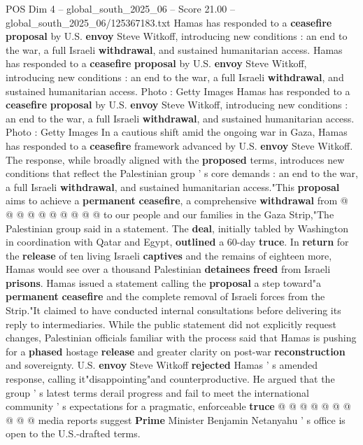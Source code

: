 \begin{textsample}{POS Dim 4 – global\_south\_2025\_06 – Score 21.00 – global\_south\_2025\_06/125367183.txt}  \label{ex:f4_pos_352}
Hamas has responded to a \textbf{ceasefire} \textbf{proposal} by U.S. \textbf{envoy} Steve Witkoff, introducing new conditions : an end to the war, a full Israeli \textbf{withdrawal}, and sustained humanitarian access.
Hamas has responded to a \textbf{ceasefire} \textbf{proposal} by U.S. \textbf{envoy} Steve Witkoff, introducing new conditions : an end to the war, a full Israeli \textbf{withdrawal}, and sustained humanitarian access.
Photo : Getty Images Hamas has responded to a \textbf{ceasefire} \textbf{proposal} by U.S. \textbf{envoy} Steve Witkoff, introducing new conditions : an end to the war, a full Israeli \textbf{withdrawal}, and sustained humanitarian access.
Photo : Getty Images In a cautious shift amid the ongoing war in Gaza, Hamas has responded to a \textbf{ceasefire} framework advanced by U.S. \textbf{envoy} Steve Witkoff.
The response, while broadly aligned with the \textbf{proposed} terms, introduces new conditions that reflect the Palestinian group ' s core demands : an end to the war, a full Israeli \textbf{withdrawal}, and sustained humanitarian access."This \textbf{proposal} aims to achieve a \textbf{permanent} \textbf{ceasefire}, a comprehensive \textbf{withdrawal} from @ @ @ @ @ @ @ @ @ @ to our people and our families in the Gaza Strip,"The Palestinian group said in a statement.
The \textbf{deal}, initially tabled by Washington in coordination with Qatar and Egypt, \textbf{outlined} a 60-day \textbf{truce}.
In \textbf{return} for the \textbf{release} of ten living Israeli \textbf{captives} and the remains of eighteen more, Hamas would see over a thousand Palestinian \textbf{detainees} \textbf{freed} from Israeli \textbf{prisons}.
Hamas issued a statement calling the \textbf{proposal} a step toward"a \textbf{permanent} \textbf{ceasefire} and the complete removal of Israeli forces from the Strip."It claimed to have conducted internal consultations before delivering its reply to intermediaries.
While the public statement did not explicitly request changes, Palestinian officials familiar with the process said that Hamas is pushing for a \textbf{phased} hostage \textbf{release} and greater clarity on post-war \textbf{reconstruction} and sovereignty.
U.S. \textbf{envoy} Steve Witkoff \textbf{rejected} Hamas ' s amended response, calling it"disappointing"and counterproductive.
He argued that the group ' s latest terms derail progress and fail to meet the international community ' s expectations for a pragmatic, enforceable \textbf{truce} @ @ @ @ @ @ @ @ @ @ media reports suggest \textbf{Prime} Minister Benjamin Netanyahu ' s office is open to the U.S.-drafted terms.

\end{textsample}
